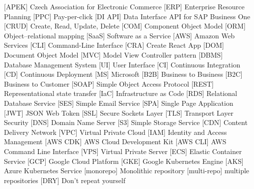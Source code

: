 \documentclass[12pt,a4paper]{report}
\begin{document}
\begin{acronym}[ICANN]
     [APEK] {Czech Association for Electronic Commerce}
     [ERP] {Enterprise Resource Planning}
     [PPC] {Pay-per-click}
     [DI API] {Data Interface API for SAP Business One}
     [CRUD] {Create, Read, Update, Delete}
     [COM] {Component Object Model}
     [ORM] {Object–relational mapping}
     [SaaS] {Software as a Service}
     [AWS] {Amazon Web Services}
     [CLI] {Command-Line Interface}
     [CRA] {Create React App}
     [DOM] {Document Object Model}
     [MVC] {Model View Controller pattern}
     [DBMS] {Database Management System}
     [UI] {User Interface}
     [CI] {Continuous Integration}
     [CD] {Continuous Deployment}
     [MS] {Microsoft}
     [B2B] {Business to Business}
     [B2C] {Business to Customer}
     [SOAP] {Simple Object Access Protocol}
     [REST] {Representational state transfer}
     [IaC] {Infrastructure as Code}
     [RDS] {Relational Database Service}
     [SES] {Simple Email Service}
     [SPA] {Single Page Application}
     [JWT] {JSON Web Token}
     [SSL] {Secure Sockets Layer}
     [TLS] {Transport Layer Security}
     [DNS] {Domain Name Server}
     [S3] {Simple Storage Service}
     [CDN] {Content Delivery Network}
     [VPC] {Virtual Private Cloud}
     [IAM] {Identity and Access Management}
     [AWS CDK] {AWS Cloud Development Kit}
     [AWS CLI] {AWS Command Line Interface}
     [VPS] {Virtual Private Server}
     [ECS] {Elastic Container Service}
     [GCP] {Google Cloud Platform}
     [GKE] {Google Kubernetes Engine}
     [AKS] {Azure Kubernetes Service}
     [monorepo] {Monolithic repository}
     [multi-repo] {multiple repositories}
     [DRY] {Don't repeat yourself}
\end{acronym}
\end{document}
